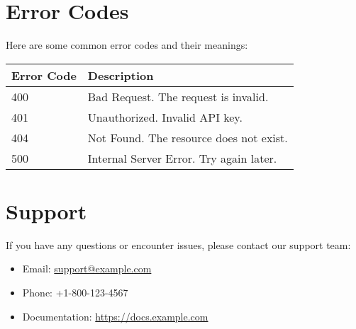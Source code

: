 \documentclass[a4paper,12pt]{article}
\begin{document}
\section{Error Codes}
Here are some common error codes and their meanings:

\begin{tabular}{|l|l|}
\hline
\textbf{Error Code} & \textbf{Description} \\ \hline
400 & Bad Request. The request is invalid. \\ \hline
401 & Unauthorized. Invalid API key. \\ \hline
404 & Not Found. The resource does not exist. \\ \hline
500 & Internal Server Error. Try again later. \\ \hline
\end{tabular}

\newpage

\section{Support}
If you have any questions or encounter issues, please contact our support team:
\begin{itemize}
    \item Email: \href{mailto:support@example.com}{support@example.com}
    \item Phone: +1-800-123-4567
    \item Documentation: \href{https://docs.example.com}{https://docs.example.com}
\end{itemize}
\end{document}
